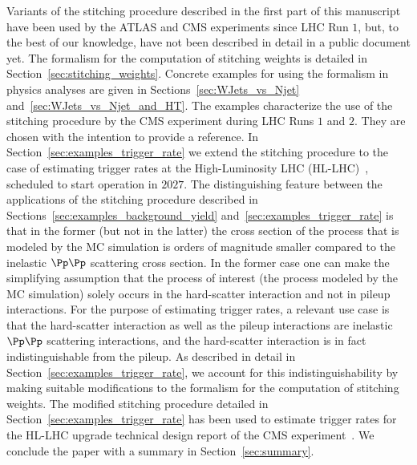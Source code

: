 Variants of the stitching procedure described in the first part of this manuscript have been used by the ATLAS and CMS experiments since LHC Run $1$,
but, to the best of our knowledge, have not been described in detail in a public document yet.
The formalism for the computation of stitching weights is detailed in Section~\ref{sec:stitching_weights}.
Concrete examples for using the formalism in physics analyses are given in Sections~\ref{sec:WJets_vs_Njet} and~\ref{sec:WJets_vs_Njet_and_HT}.
The examples characterize the use of the stitching procedure by the CMS experiment during LHC Runs $1$ and $2$.
They are chosen with the intention to provide a reference.
In Section~\ref{sec:examples_trigger_rate} we extend the stitching procedure to the case of estimating trigger rates at the High-Luminosity LHC (HL-LHC)~\cite{TDR_Phase2_LHC},
scheduled to start operation in $2027$.
The distinguishing feature between the applications of the stitching procedure described in Sections~\ref{sec:examples_background_yield} and~\ref{sec:examples_trigger_rate}
is that in the former (but not in the latter) the cross section of the process that is modeled by the MC simulation
is orders of magnitude smaller compared to the inelastic $\Pp\Pp$ scattering cross section.
In the former case one can make the simplifying assumption that the process of interest (the process modeled by the MC simulation) 
solely occurs in the hard-scatter interaction and not in pileup interactions.
For the purpose of estimating trigger rates, a relevant use case is that the hard-scatter interaction as well as the pileup interactions are inelastic $\Pp\Pp$ scattering interactions,
and the hard-scatter interaction is in fact indistinguishable from the pileup.
As described in detail in Section~\ref{sec:examples_trigger_rate},
we account for this indistinguishability by making suitable modifications to the formalism for the computation of stitching weights.
The modified stitching procedure detailed in Section~\ref{sec:examples_trigger_rate} has been used to estimate trigger rates 
for the HL-LHC upgrade technical design report of the CMS experiment~\cite{TDR-21-001}.
We conclude the paper with a summary in Section~\ref{sec:summary}.
